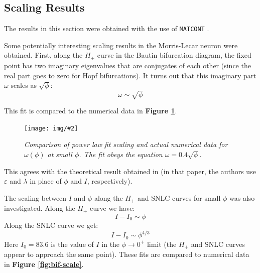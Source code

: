\documentclass[letterpaper,12pt]{article}
\numberwithin{table}{section}
\numberwithin{figure}{section}
\numberwithin{equation}{section}
\newcommand{\centerfig}[2]{\begin{center}\texttt{[image: img/\#2]}\end{center}}
\newcommand{\ccaption}[1]{\caption{\textit{#1}}}
\newcommand{\reffig}[1]{\textbf{Figure \ref{#1}}}
\begin{document}
\begin{flushleft}
    \subsection{Scaling Results}

    The results in this section were obtained with the use of \texttt{MATCONT} \cite{matcont}.

    Some potentially interesting scaling results in the Morris-Lecar neuron were obtained. First, along the $H_+$ curve in the Bautin bifurcation diagram, the fixed point has two imaginary eigenvalues that are conjugates of each other (since the real part goes to zero for Hopf bifurcations). It turns out that this imaginary part $\omega$ scales as $\sqrt{\phi}$:
    \begin{equation}
        \omega \sim \sqrt{\phi}
    \end{equation}

    This fit is compared to the numerical data in \reffig{fig:phi-im-scale}.
    \begin{figure}[h]

        \centering
 
        \centerfig{0.8}{phi-im-scale.jpg}
    
        \captionsetup{width=0.8\linewidth}
        \ccaption{Comparison of power law fit scaling and actual numerical data for $\omega(\phi)$ at small $\phi$. The fit obeys the equation $\omega = 0.4\sqrt{\phi}$.}
        \label{fig:phi-im-scale}
    
    \end{figure}

    This agrees with the theoretical result obtained in \cite{baer} (in that paper, the authors use $\varepsilon$ and $\lambda$ in place of $\phi$ and $I$, respectively).

    The scaling between $I$ and $\phi$ along the $H_+$ and SNLC curves for small $\phi$ was also investigated. Along the $H_+$ curve we have:
    \begin{equation}
        I - I_0 \sim \phi
    \end{equation}
    Along the SNLC curve we get:
    \begin{equation}
        I - I_0 \sim \phi^{4/3}
    \end{equation}
    Here $I_0 = 83.6$ is the value of $I$ in the $\phi \to 0^+$ limit (the $H_+$ and SNLC curves appear to approach the same point). These fits are compared to numerical data in \reffig{fig:bif-scale}.
    \begin{figure}[!h]


\end{figure}
\end{flushleft}
\end{document}
